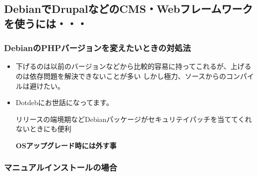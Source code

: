 \documentclass[mingoth,a4paper]{jsarticle}
\begin{document}
\subsection{DebianでDrupalなどのCMS・Webフレームワークを使うには・・・}
\subsubsection{DebianのPHPバージョンを変えたいときの対処法}
\begin{itemize}
\item 下げるのは以前のバージョンなどから比較的容易に持ってこれるが、上げるのは依存問題を解決できないことが多い
  しかし極力、ソースからのコンパイルは避けたい。
\item Dotdebにお世話になってます。\cite{dotdeb}

  リリースの端境期などDebianパッケージがセキュリテイパッチを当ててくれないときにも便利

  {\bf OSアップグレード時には外す事}
\end{itemize}

\subsubsection{マニュアルインストールの場合}
\end{document}
